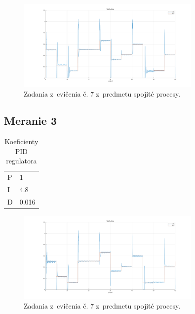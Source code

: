 \documentclass{article}
\begin{document}
\begin{figure}[!htbp]
	\begin{center}
		\includegraphics[width=0.8\textwidth]{./include/m3.png}
	\end{center}
	\caption{Zadania z~cvičenia č. 7 z~predmetu spojité procesy.}
	\label{fig:meranie2}
\end{figure}

\clearpage

\subsection{Meranie 3}
\label{sec:meranie3}

\begin{table}[!htbp]
	\caption{Koeficienty PID regulatora}
	\label{tab:t3}
	\begin{center}
		\begin{tabular}[c]{|l|l|}
			\hline
			P & 1 \\
			I & 4.8 \\
			D & 0.016 \\
			\hline
		\end{tabular}
	\end{center}
\end{table}

\begin{figure}[!htbp]
	\begin{center}
		\includegraphics[width=0.8\textwidth]{./include/m4.png}
	\end{center}
	\caption{Zadania z~cvičenia č. 7 z~predmetu spojité procesy.}
	\label{fig:meranie3}
\end{figure}
\end{document}
